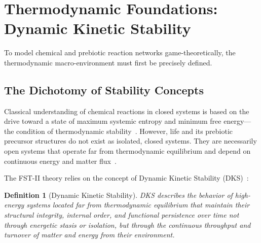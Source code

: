 \documentclass[12pt,a4paper]{article}
\newtheorem{definition}{Definition}
\theoremstyle{remark}
\begin{document}
\section{Thermodynamic Foundations: Dynamic Kinetic Stability}
\label{sec:thermodynamics}

To model chemical and prebiotic reaction networks game-theoretically, the thermodynamic macro-environment must first be precisely defined.

\subsection{The Dichotomy of Stability Concepts}

Classical understanding of chemical reactions in closed systems is based on the drive toward a state of maximum systemic entropy and minimum free energy---the condition of thermodynamic stability~\citep{Pross2012}. However, life and its prebiotic precursor structures do not exist as isolated, closed systems. They are necessarily open systems that operate far from thermodynamic equilibrium and depend on continuous energy and matter flux~\citep{Bioenergetics}.

The FST-II theory relies on the concept of Dynamic Kinetic Stability (DKS)~\citep{Pross2012}:

\begin{definition}[Dynamic Kinetic Stability]
DKS describes the behavior of high-energy systems located far from thermodynamic equilibrium that maintain their structural integrity, internal order, and functional persistence over time not through energetic stasis or isolation, but through the continuous throughput and turnover of matter and energy from their environment.
\end{definition}
\end{document}
